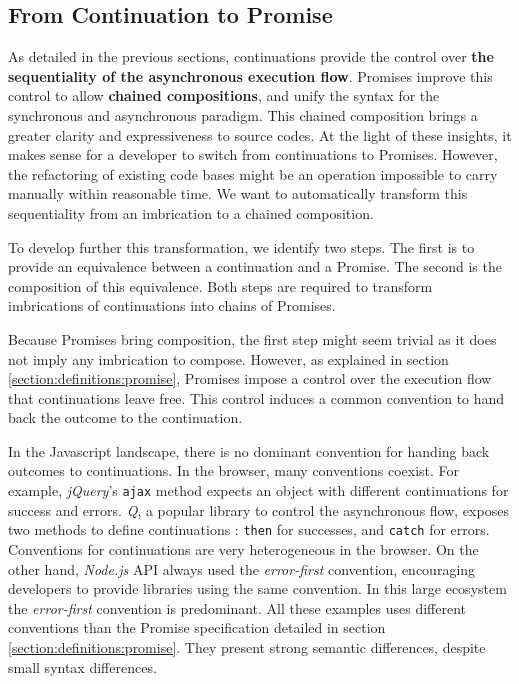 \subsection{From Continuation to Promise} \label{seciton:definitions:analysis}

As detailed in the previous sections, continuations provide the control over \textbf{the sequentiality of the asynchronous execution flow}.
Promises improve this control to allow \textbf{chained compositions}, and unify the syntax for the synchronous and asynchronous paradigm.
This chained composition brings a greater clarity and expressiveness to source codes.
At the light of these insights, it makes sense for a developer to switch from continuations to Promises.
However, the refactoring of existing code bases might be an operation impossible to carry manually within reasonable time.
We want to automatically transform this sequentiality from an imbrication to a chained composition.

To develop further this transformation, we identify two steps.
The first is to provide an equivalence between a continuation and a Promise.
The second is the composition of this equivalence.
Both steps are required to transform imbrications of continuations into chains of Promises.

Because Promises bring composition, the first step might seem trivial as it does not imply any imbrication to compose.
However, as explained in section \ref{section:definitions:promise}, Promises impose a control over the execution flow that continuations leave free.
This control induces a common convention to hand back the outcome to the continuation.

In the Javascript landscape, there is no dominant convention for handing back outcomes to continuations.
In the browser, many conventions coexist.
For example, \textit{jQuery}'s \texttt{ajax} method expects an object with different continuations for success and errors.
\textit{Q}, a popular library to control the asynchronous flow, exposes two methods to define continuations : \texttt{then} for successes, and \texttt{catch} for errors.
Conventions for continuations are very heterogeneous in the browser.
On the other hand, \textit{Node.js} API always used the \textit{error-first} convention, encouraging developers to provide libraries using the same convention.
In this large ecosystem the \textit{error-first} convention is predominant.
All these examples uses different conventions than the Promise specification detailed in section \ref{section:definitions:promise}.
They present strong semantic differences, despite small syntax differences.

